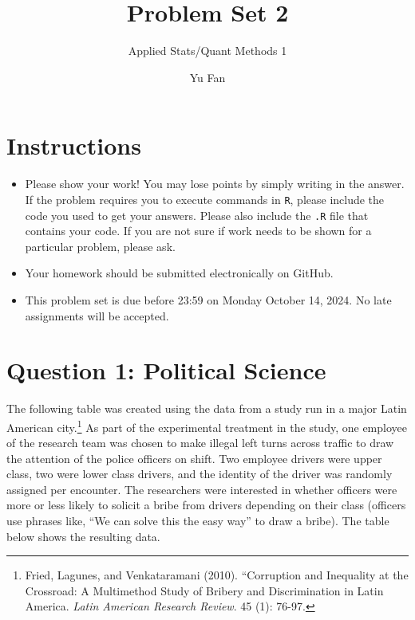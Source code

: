 \documentclass[12pt,letterpaper]{article}
\title{Problem Set 2}
\date{Yu Fan}
\author{Applied Stats/Quant Methods 1}
\begin{document}
	\maketitle
	\section*{Instructions}
	\begin{itemize}
		\item Please show your work! You may lose points by simply writing in the answer. If the problem requires you to execute commands in \texttt{R}, please include the code you used to get your answers. Please also include the \texttt{.R} file that contains your code. If you are not sure if work needs to be shown for a particular problem, please ask.
		\item Your homework should be submitted electronically on GitHub.
		\item This problem set is due before 23:59 on Monday October 14, 2024. No late assignments will be accepted.
		
	\end{itemize}
	
	
	\vspace{.5cm}
	\section*{Question 1: Political Science}
	\vspace{.25cm}
	The following table was created using the data from a study run in a major Latin American city.\footnote{Fried, Lagunes, and Venkataramani (2010). ``Corruption and Inequality at the Crossroad: A Multimethod Study of Bribery and Discrimination in Latin America. \textit{Latin American Research Review}. 45 (1): 76-97.} As part of the experimental treatment in the study, one employee of the research team was chosen to make illegal left turns across traffic to draw the attention of the police officers on shift. Two employee drivers were upper class, two were lower class drivers, and the identity of the driver was randomly assigned per encounter. The researchers were interested in whether officers were more or less likely to solicit a bribe from drivers depending on their class (officers use phrases like, ``We can solve this the easy way'' to draw a bribe). The table below shows the resulting data.
\end{document}
